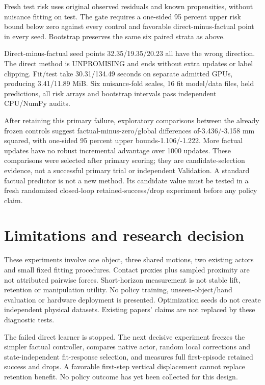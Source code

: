 \documentclass[10pt]{article}
\begin{document}
Fresh test risk uses original observed residuals and known propensities, without
nuisance fitting on test. The gate requires a one-sided 95 percent upper risk bound
below zero against every control and favorable direct-minus-factual point in every
seed. Bootstrap preserves the same six paired strata as above.

\begin{table}[h]
\centering

\caption{Direct randomized learner minus each frozen control, mm squared; every fixed gate fails.}
\end{table}

Direct-minus-factual seed points 32.35/19.35/20.23 all have the wrong direction.
The direct method is UNPROMISING and ends without extra updates or label clipping.
Fit/test take 30.31/134.49 seconds on separate admitted GPUs, producing 3.41/11.89 MiB.
Six nuisance-fold scales, 16 fit model/data files, held predictions, all risk arrays
and bootstrap intervals pass independent CPU/NumPy audits.

After retaining this primary failure, exploratory comparisons between the already
frozen controls suggest factual-minus-zero/global differences of-3.436/-3.158 mm
squared, with one-sided 95 percent upper bounds-1.106/-1.222. More factual updates
have no robust incremental advantage over 1000 updates. These comparisons were
selected after primary scoring; they are candidate-selection evidence, not a
successful primary trial or independent Validation. A standard factual predictor
is not a new method. Its candidate value must be tested in a fresh randomized
closed-loop retained-success/drop experiment before any policy claim.

\section{Limitations and research decision}
These experiments involve one object, three shared motions, two existing actors
and small fixed fitting procedures. Contact proxies plus sampled proximity are
not attributed pairwise forces. Short-horizon measurement is not stable lift,
retention or manipulation utility. No policy training, unseen-object/hand evaluation
or hardware deployment is presented. Optimization seeds do not create independent
physical datasets. Existing papers' claims are not replaced by these diagnostic tests.

The failed direct learner is stopped. The next decisive experiment freezes the
simpler factual controller, compares native actor, random local corrections and
state-independent fit-response selection, and measures full first-episode retained
success and drops. A favorable first-step vertical displacement cannot replace
retention benefit. No policy outcome has yet been collected for this design.
\end{document}
